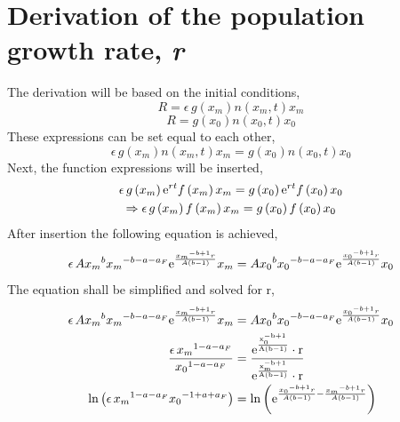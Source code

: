 \documentclass{article}
\numberwithin{equation}{section} %
\begin{document}
\section{Derivation of the population growth rate, \textit{r}}\label{a:derivation_r}
The derivation will be based on the initial conditions,
\begin{equation}
    R=\epsilon\,g \left( x_{m} \right) n \left( x_{m},t \right) x_{m}
\end{equation}
\begin{equation}
    R=g \left( x_{0} \right) n \left( x_{0},t \right) x_{0}
\end{equation}
These expressions can be set equal to each other,
\begin{equation}
    \epsilon\,g \left( x_{m} \right) n \left( x_{m},t \right) x_{m}=g \left( x_{0} \right) n \left( x_{0},t \right) x_{0}
\end{equation}
Next, the function expressions will be inserted,
\begin{gather*}
     \epsilon\,g \left( x_{m} \right) {{\rm e}^{rt}}f \left( x_{m} \right) 
x_{m}=g \left( x_{0} \right) {{\rm e}^{rt}}f \left( x_{0} \right) x_{0}\\
\Rightarrow\epsilon\,g \left( x_{m} \right) f \left( x_{m} \right) x_{m}=g
 \left( x_{0} \right) f \left( x_{0} \right) x_{0}
\end{gather*}
After insertion the following equation is achieved,
\begin{equation}
    \epsilon\,A{x_{m}}^{b}{x_{m}}^{-b-a-a_{F}}{{\rm e}^{{\frac {{x_{m}}^{-
b+1}r}{A \left( b-1 \right) }}}}x_{m}=A{x_{0}}^{b}{x_{0}}^{-b-a-a_{F}}
{{\rm e}^{{\frac {{x_{0}}^{-b+1}r}{A \left( b-1 \right) }}}}x_{0}
\end{equation}
The equation shall be simplified and solved for r,
\begin{align*}
    \epsilon\,A{x_{m}}^{b}{x_{m}}^{-b-a-a_{F}}{{\rm e}^{{\frac {{x_{m}}^{-
b+1}r}{A \left( b-1 \right) }}}}x_{m}&=A{x_{0}}^{b}{x_{0}}^{-b-a-a_{F}}
{{\rm e}^{{\frac {{x_{0}}^{-b+1}r}{A \left( b-1 \right) }}}}x_{0}\\
{\frac {\epsilon\,{x_{m}}^{1-a-a_{F}}}{{x_{0}}^{1-a-a_{F}}}}&=\dfrac{\rm{e}^{\frac{x_{0}^{-b+1}}{A(b-1)}}\cdot r}{\rm{e}^{\frac{x_{m}^{-b+1}}{A(b-1)}}\cdot r}\\
\ln  \left( \epsilon\,{x_{m}}^{1-a-a_{F}}{x_{0}}^{-1+a+a_{F}} \right) 
&=\ln  \left( {{\rm e}^{{\frac {{x_{0}}^{-b+1}r}{A \left( b-1 \right) }
}-{\frac {{x_{m}}^{-b+1}r}{A \left( b-1 \right) }}}} \right) 
\end{align*}
\end{document}
